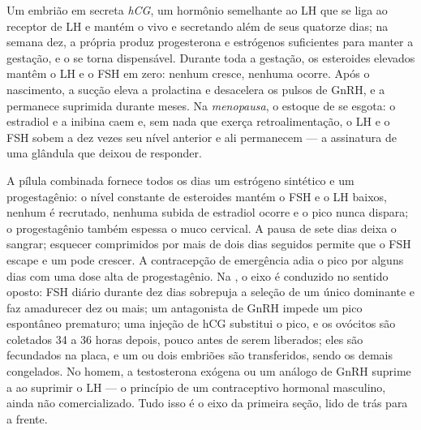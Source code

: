 \begin{proposition}\label{prop:b2:reproductive-hormones:overrides}
Um embrião em  secreta \emph{hCG}, um hormônio semelhante ao
LH que se liga ao receptor de LH e mantém o  vivo e
secretando além de seus quatorze dias; na semana dez, a própria
 produz progesterona e estrógenos suficientes para manter a
gestação, e o  se torna dispensável. Durante toda a
gestação, os esteroides elevados mantêm o LH e o FSH em zero: nenhum
 cresce, nenhuma  ocorre. Após o nascimento, a sucção
eleva a prolactina e desacelera os pulsos de GnRH, e a 
permanece suprimida durante meses. Na \emph{menopausa}, o estoque de
 se esgota: o estradiol e a inibina caem e, sem nada que
exerça retroalimentação, o LH e o FSH sobem a dez vezes seu nível
anterior e ali permanecem --- a assinatura de uma glândula que deixou
de responder.
\end{proposition}

\begin{proposition}\label{prop:b2:reproductive-hormones:clinic}
A pílula combinada fornece todos os dias um estrógeno sintético e um
progestagênio: o nível constante de esteroides mantém o FSH e o LH
baixos, nenhum  é recrutado, nenhuma subida de estradiol
ocorre e o pico nunca dispara; o progestagênio também espessa o muco
cervical. A pausa de sete dias deixa o  sangrar; esquecer
comprimidos por mais de dois dias seguidos permite que o FSH escape e
um  pode crescer. A contracepção de emergência adia o pico por
alguns dias com uma dose alta de progestagênio. Na \emph{}, o eixo é conduzido no sentido oposto: FSH diário durante dez
dias sobrepuja a seleção de um único  dominante e faz
amadurecer dez ou mais; um antagonista de GnRH impede um pico
espontâneo prematuro; uma injeção de hCG substitui o pico, e os
ovócitos são coletados 34 a 36 horas depois, pouco antes de serem
liberados; eles são fecundados na placa, e um ou dois embriões são
transferidos, sendo os demais congelados. No homem, a testosterona
exógena ou um análogo de GnRH suprime a  ao suprimir o
LH --- o princípio de um contraceptivo hormonal masculino, ainda não
comercializado. Tudo isso é o eixo da primeira seção, lido de trás
para a frente.
\end{proposition}

